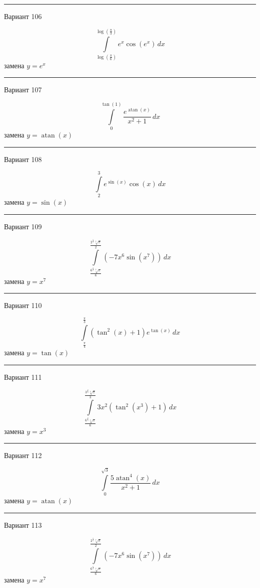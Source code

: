 \documentclass[11pt]{report}
\begin{document}
\rule{\textwidth}{.2mm}

Вариант 106

$$\int\limits_{\log{\left(\frac{\pi}{6} \right)}}^{\log{\left(\frac{\pi}{3} \right)}} e^{x} \cos{\left(e^{x} \right)}\, dx$$
замена $y = e^{x}$



\rule{\textwidth}{.2mm}

Вариант 107

$$\int\limits_{0}^{\tan{\left(1 \right)}} \frac{e^{\operatorname{atan}{\left(x \right)}}}{x^{2} + 1}\, dx$$
замена $y = \operatorname{atan}{\left(x \right)}$



\rule{\textwidth}{.2mm}

Вариант 108

$$\int\limits_{2}^{3} e^{\sin{\left(x \right)}} \cos{\left(x \right)}\, dx$$
замена $y = \sin{\left(x \right)}$



\rule{\textwidth}{.2mm}

Вариант 109

$$\int\limits_{\frac{6^{\frac{6}{7}} \sqrt[7]{\pi}}{6}}^{\frac{2^{\frac{5}{7}} \sqrt[7]{\pi}}{2}} \left(- 7 x^{6} \sin{\left(x^{7} \right)}\right)\, dx$$
замена $y = x^{7}$



\rule{\textwidth}{.2mm}

Вариант 110

$$\int\limits_{\frac{\pi}{4}}^{\frac{\pi}{3}} \left(\tan^{2}{\left(x \right)} + 1\right) e^{\tan{\left(x \right)}}\, dx$$
замена $y = \tan{\left(x \right)}$



\rule{\textwidth}{.2mm}

Вариант 111

$$\int\limits_{\frac{6^{\frac{2}{3}} \sqrt[3]{\pi}}{6}}^{\frac{3^{\frac{2}{3}} \sqrt[3]{\pi}}{3}} 3 x^{2} \left(\tan^{2}{\left(x^{3} \right)} + 1\right)\, dx$$
замена $y = x^{3}$



\rule{\textwidth}{.2mm}

Вариант 112

$$\int\limits_{0}^{\sqrt{3}} \frac{5 \operatorname{atan}^{4}{\left(x \right)}}{x^{2} + 1}\, dx$$
замена $y = \operatorname{atan}{\left(x \right)}$



\rule{\textwidth}{.2mm}

Вариант 113

$$\int\limits_{\frac{6^{\frac{6}{7}} \sqrt[7]{\pi}}{6}}^{\frac{2^{\frac{5}{7}} \sqrt[7]{\pi}}{2}} \left(- 7 x^{6} \sin{\left(x^{7} \right)}\right)\, dx$$
замена $y = x^{7}$
\end{document}
